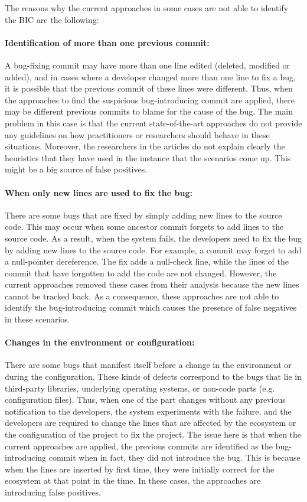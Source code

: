 \documentclass[a4paper, 12pt]{book}
\begin{document}
The reasons why the current approaches in some cases are not able to identify the BIC are the following: 

\paragraph {Identification of more than one previous commit:} A bug-fixing commit may have more than one line edited (deleted, modified or added), and in cases where a developer changed more than one line to fix a bug, it is possible that the previous commit of these lines were different. Thus, when the approaches to find the suspicious bug-introducing commit are applied, there may be different previous commits to blame for the cause of the bug. The main problem in this case is that the current state-of-the-art approaches do not provide any guidelines on how practitioners or researchers should behave in these situations. Moreover, the researchers in the articles do not explain clearly the heuristics that they have used in the instance that the scenarios come up. This might be a big source of false positives.

\paragraph {When only new lines are used to fix the bug:} There are some bugs that are fixed by simply adding new lines to the source code. This may occur when some ancestor commit forgets to add lines to the source code. As a result, when the system fails, the developers need to fix the bug by adding new lines to the source code. For example, a commit may forget to add a null-pointer dereference. The fix adds a null-check line, while the lines of the commit that have forgotten to add the code are not changed. However, the current approaches removed these cases from their analysis because the new lines cannot be tracked back. As a consequence, these approaches are not able to identify the bug-introducing commit which causes the presence of false negatives in these scenarios.

\paragraph {Changes in the environment or configuration:} There are some bugs that manifest itself before a change in the environment or during the configuration. These kinds of defects correspond to the bugs that lie in third-party libraries, underlying operating systems, or non-code parts (e.g. configuration files). Thus, when one of the part changes without any previous notification to the developers, the system experiments with the failure, and the developers are required to change the lines that are affected by the ecosystem or the configuration of the project to fix the project. The issue here is that when the current approaches are applied, the previous commits are identified as the bug-introducing commit when in fact, they did not introduce the bug. This is because when the lines are inserted by first time, they were initially correct for the ecosystem at that point in the time. In these cases, the approaches are introducing false positives.
\end{document}
